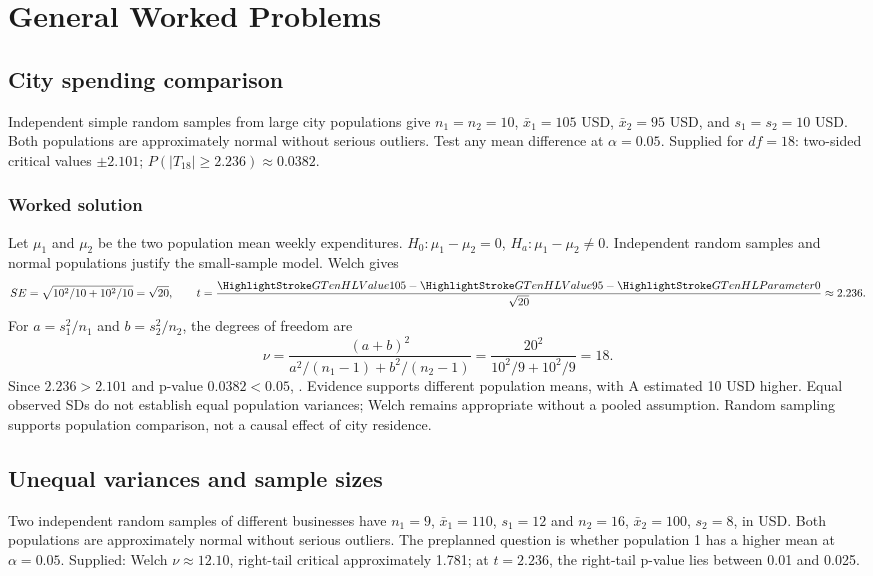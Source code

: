 \section{General Worked Problems}\label{sec:general-worked}
\subsection{City spending comparison}\label{prob:equal}
Independent simple random samples from large city populations give $n_1=n_2=10$, $\bar x_1=105$ USD, $\bar x_2=95$ USD, and $s_1=s_2=10$ USD. Both populations are approximately normal without serious outliers. Test any mean difference at $\alpha=0.05$. Supplied for $df=18$: two-sided critical values $\pm2.101$; $P(|T_{18}|\ge2.236)\approx0.0382$.
\subsubsection*{Worked solution}\label{sol:equal}
Let $\mu_1$ and $\mu_2$ be the two population mean weekly expenditures. $H_0:\mu_1-\mu_2=0$, $H_a:\mu_1-\mu_2\ne0$. Independent random samples and normal populations justify the small-sample model. Welch gives
\[
SE=\sqrt{10^2/10+10^2/10}=\sqrt{20},\qquad
t=\frac{\Obs{105}-\Obs{95}-\Pop{0}}{\sqrt{20}}\approx2.236.
\]
For $a=s_1^2/n_1$ and $b=s_2^2/n_2$, the degrees of freedom are
\[
\nu=\frac{(a+b)^2}{a^2/(n_1-1)+b^2/(n_2-1)}
=\frac{20^2}{10^2/9+10^2/9}=18.
\]
Since $2.236>2.101$ and p-value $0.0382<0.05$, . Evidence supports different population means, with A estimated 10 USD higher. Equal observed SDs do not establish equal population variances; Welch remains appropriate without a pooled assumption. Random sampling supports population comparison, not a causal effect of city residence.
\subsection{Unequal variances and sample sizes}\label{prob:unequal}
Two independent random samples of different businesses have $n_1=9$, $\bar x_1=110$, $s_1=12$ and $n_2=16$, $\bar x_2=100$, $s_2=8$, in USD. Both populations are approximately normal without serious outliers. The preplanned question is whether population 1 has a higher mean at $\alpha=0.05$. Supplied: Welch $\nu\approx12.10$, right-tail critical approximately 1.781; at $t=2.236$, the right-tail p-value lies between 0.01 and 0.025.
